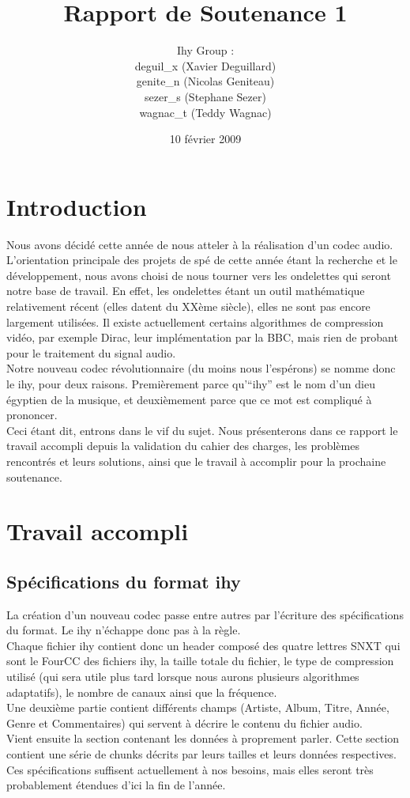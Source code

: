 \documentclass[a4paper,12pt]{article}
\title{Rapport de Soutenance 1}
\author{
Ihy Group : \\
deguil\_x (Xavier Deguillard)\\
genite\_n (Nicolas Geniteau)\\
sezer\_s (Stephane Sezer)\\
wagnac\_t (Teddy Wagnac)
}
\date{10 f\'evrier 2009}
\begin{document}
\maketitle

\newpage

\section*{Introduction}
Nous avons décidé cette année de nous atteler à la réalisation d'un codec audio.
L'orientation principale des projets de spé de cette année étant la recherche et
le développement, nous avons choisi de nous tourner vers les ondelettes qui
seront notre base de travail. En effet, les ondelettes étant un outil
mathématique relativement récent (elles datent du XXème siècle), elles ne sont
pas encore largement utilisées.  Il existe actuellement certains algorithmes de
compression vidéo, par exemple Dirac, leur implémentation par la BBC, mais rien
de probant pour le traitement du signal audio.\\
Notre nouveau codec révolutionnaire (du moins nous l'espérons) se nomme donc le
ihy, pour deux raisons. Premièrement parce qu'``ihy'' est le nom d'un dieu
égyptien de la musique, et deuxièmement parce que ce mot est compliqué à
prononcer.\\
Ceci étant dit, entrons dans le vif du sujet. Nous présenterons dans ce rapport
le travail accompli depuis la validation du cahier des charges, les problèmes
rencontrés et leurs solutions, ainsi que le travail à accomplir pour la
prochaine soutenance.

\newpage

\tableofcontents

\newpage

\section{Travail accompli}

	\subsection{Spécifications du format ihy}
La création d'un nouveau codec passe entre autres par l'écriture des
spécifications du format. Le ihy n'échappe donc pas à la règle.\\
Chaque fichier
ihy contient donc un header composé des quatre lettres SNXT qui sont le FourCC
des fichiers ihy, la taille totale du fichier, le type de compression utilisé
(qui sera utile plus tard lorsque nous aurons plusieurs algorithmes adaptatifs),
le nombre de canaux ainsi que la fréquence.\\
Une deuxième partie contient
différents champs (Artiste, Album, Titre, Année, Genre et Commentaires) qui
servent à décrire le contenu du fichier audio.\\
Vient ensuite la section contenant les données à proprement parler. Cette
section contient une série de chunks décrits par leurs tailles et leurs données
respectives.\\
Ces spécifications suffisent actuellement à nos besoins, mais elles seront très
probablement étendues d'ici la fin de l'année.
\end{document}
